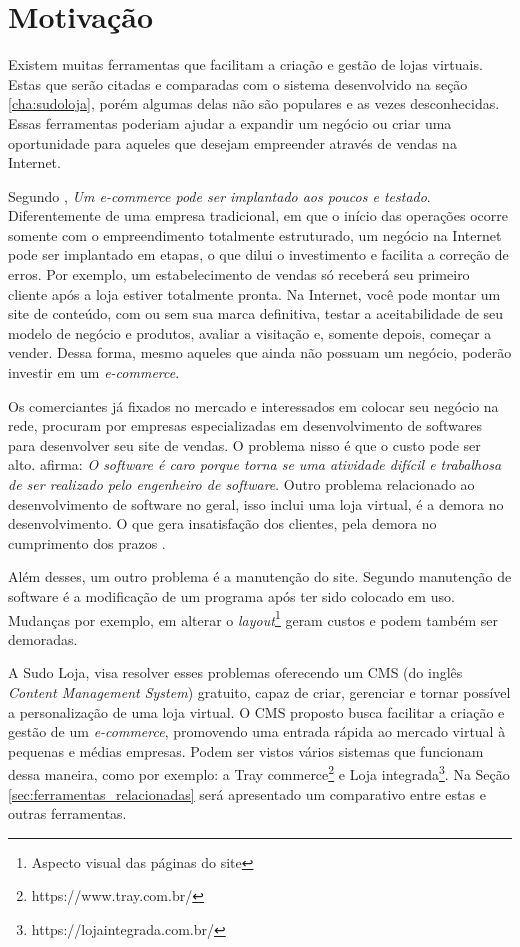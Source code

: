 \documentclass[a4paper,12pt]{monografia}
\begin{document}
\section{Motivação} %
\label{sec:motivacao}

Existem muitas ferramentas que facilitam a criação e gestão de lojas virtuais. Estas que serão citadas e comparadas com o sistema desenvolvido na seção \ref{cha:sudoloja}, porém algumas delas não são populares e as vezes desconhecidas. Essas ferramentas poderiam ajudar a expandir um negócio ou criar uma oportunidade para aqueles que desejam empreender através de vendas na Internet. 

Segundo , \textit{Um e-commerce pode ser implantado aos poucos e testado}. Diferentemente de uma empresa tradicional, em que o início das operações ocorre somente com o empreendimento totalmente estruturado, um negócio na Internet pode ser implantado em etapas, o que dilui o investimento e facilita a correção de erros. Por exemplo, um estabelecimento de vendas só receberá seu primeiro cliente após a loja estiver totalmente pronta. Na Internet, você pode montar um site de conteúdo, com ou sem sua marca definitiva, testar a aceitabilidade de seu modelo de negócio e produtos, avaliar a visitação e, somente depois, começar a vender. Dessa forma, mesmo aqueles que ainda não possuam um negócio, poderão investir em um \textit{e-commerce}.

Os comerciantes já fixados no mercado e interessados em colocar seu negócio na rede, procuram por empresas especializadas em desenvolvimento de softwares para desenvolver seu site de vendas. O problema nisso é que o custo pode ser alto.  afirma: \textit{O software é caro porque torna se uma atividade difícil e trabalhosa de ser realizado pelo engenheiro de software}.  Outro problema relacionado ao desenvolvimento de software no geral, isso inclui uma loja virtual, é a demora no desenvolvimento. O que gera insatisfação dos clientes, pela demora no cumprimento dos prazos \cite{pressman}.

Além desses, um outro problema é a manutenção do site. Segundo  manutenção de software é a modificação de um programa após ter sido colocado em uso. Mudanças por exemplo, em alterar o \textit{layout}\footnote{Aspecto visual das páginas do site} geram custos e podem também ser demoradas.

A Sudo Loja, visa resolver esses problemas oferecendo um CMS (do inglês \textit{Content Management System}) gratuito, capaz de criar, gerenciar e tornar possível a personalização de uma loja virtual. O CMS proposto busca facilitar a criação e gestão de um \textit{e-commerce}, promovendo uma entrada rápida ao mercado virtual à pequenas e médias empresas. Podem ser vistos vários sistemas que funcionam dessa maneira, como por exemplo: a Tray commerce\footnote{https://www.tray.com.br/} e Loja integrada\footnote{https://lojaintegrada.com.br/}. Na Seção \ref{sec:ferramentas_relacionadas} será apresentado um comparativo entre estas e outras ferramentas.
\end{document}

